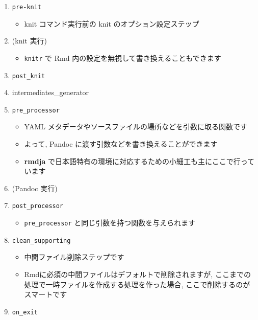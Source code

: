 \documentclass[
]{bxjsarticle}
\providecommand{\tightlist}{%
  \setlength{\itemsep}{0pt}\setlength{\parskip}{0pt}}
\begin{document}
\begin{enumerate}
\def\labelenumi{\arabic{enumi}.}
\tightlist
\item
  \texttt{pre-knit}

  \begin{itemize}
  \tightlist
  \item
    knit コマンド実行前の knit のオプション設定ステップ
  \end{itemize}
\item
  (knit 実行)

  \begin{itemize}
  \tightlist
  \item
    \texttt{knitr} で Rmd 内の設定を無視して書き換えることもできます
  \end{itemize}
\item
  \texttt{post\_knit}
\item
  intermediates\_generator
\item
  \texttt{pre\_processor}

  \begin{itemize}
  \tightlist
  \item
    YAML メタデータやソースファイルの場所などを引数に取る関数です
  \item
    よって, Pandoc に渡す引数などを書き換えることができます
  \item
    \textbf{rmdja} で日本語特有の環境に対応するための小細工も主にここで行っています
  \end{itemize}
\item
  (Pandoc 実行)
\item
  \texttt{post\_processor}

  \begin{itemize}
  \tightlist
  \item
    \texttt{pre\_processor} と同じ引数を持つ関数を与えられます
  \end{itemize}
\item
  \texttt{clean\_supporting}

  \begin{itemize}
  \tightlist
  \item
    中間ファイル削除ステップです
  \item
    Rmdに必須の中間ファイルはデフォルトで削除されますが, ここまでの処理で一時ファイルを作成する処理を作った場合, ここで削除するのがスマートです
  \end{itemize}
\item
  \texttt{on\_exit}
\end{enumerate}
\end{document}
